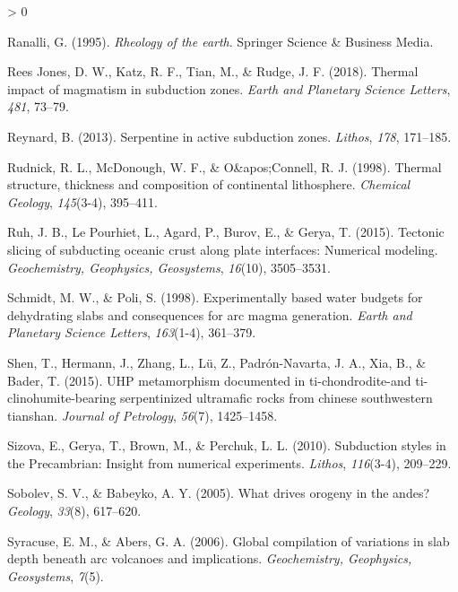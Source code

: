 \documentclass[draft,linenumbers]{agujournal2018}
\newlength{\cslhangindent}
\newenvironment{CSLReferences}[2] %
 {%
  \setlength{\parindent}{0pt}
  \ifodd #1 \everypar{\setlength{\hangindent}{\cslhangindent}}\ignorespaces\fi
  \ifnum #2 > 0
  \setlength{\parskip}{#2\baselineskip}
  \fi
 }%
 {}
\begin{document}
\begin{CSLReferences}{1}{0}
\leavevmode{}%
Ranalli, G. (1995). \emph{Rheology of the earth}. Springer Science \&
Business Media.

\leavevmode{}%
Rees Jones, D. W., Katz, R. F., Tian, M., \& Rudge, J. F. (2018).
{Thermal impact of magmatism in subduction zones}. \emph{Earth and
Planetary Science Letters}, \emph{481}, 73--79.

\leavevmode{}%
Reynard, B. (2013). {Serpentine in active subduction zones}.
\emph{Lithos}, \emph{178}, 171--185.

\leavevmode{}%
Rudnick, R. L., McDonough, W. F., \& O\&apos;Connell, R. J. (1998).
{Thermal structure, thickness and composition of continental
lithosphere}. \emph{Chemical Geology}, \emph{145}(3-4), 395--411.

\leavevmode{}%
Ruh, J. B., Le Pourhiet, L., Agard, P., Burov, E., \& Gerya, T. (2015).
{Tectonic slicing of subducting oceanic crust along plate interfaces:
Numerical modeling}. \emph{Geochemistry, Geophysics, Geosystems},
\emph{16}(10), 3505--3531.

\leavevmode{}%
Schmidt, M. W., \& Poli, S. (1998). {Experimentally based water budgets
for dehydrating slabs and consequences for arc magma generation}.
\emph{Earth and Planetary Science Letters}, \emph{163}(1-4), 361--379.

\leavevmode{}%
Shen, T., Hermann, J., Zhang, L., Lü, Z., Padrón-Navarta, J. A., Xia,
B., \& Bader, T. (2015). UHP metamorphism documented in
ti-chondrodite-and ti-clinohumite-bearing serpentinized ultramafic rocks
from chinese southwestern tianshan. \emph{Journal of Petrology},
\emph{56}(7), 1425--1458.

\leavevmode{}%
Sizova, E., Gerya, T., Brown, M., \& Perchuk, L. L. (2010). {Subduction
styles in the Precambrian: Insight from numerical experiments}.
\emph{Lithos}, \emph{116}(3-4), 209--229.

\leavevmode{}%
Sobolev, S. V., \& Babeyko, A. Y. (2005). What drives orogeny in the
andes? \emph{Geology}, \emph{33}(8), 617--620.

\leavevmode{}%
Syracuse, E. M., \& Abers, G. A. (2006). {Global compilation of
variations in slab depth beneath arc volcanoes and implications}.
\emph{Geochemistry, Geophysics, Geosystems}, \emph{7}(5).


\end{CSLReferences}
\end{document}
